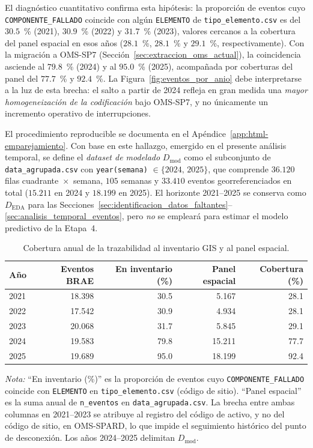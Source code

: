     El diagnóstico cuantitativo confirma esta hipótesis: la proporción de eventos cuyo \texttt{COMPONENTE\_FALLADO} coincide con algún \texttt{ELEMENTO} de \texttt{tipo\_elemento.csv} es del $30{.}5$~\% (2021), $30{.}9$~\% (2022) y $31{.}7$~\% (2023), valores cercanos a la cobertura del panel espacial en esos años ($28{.}1$~\%, $28{.}1$~\% y $29{.}1$~\%, respectivamente). Con la migración a OMS-SP7 (Sección~\ref{sec:extraccion_oms_actual}), la coincidencia asciende al $79{.}8$~\% (2024) y al $95{.}0$~\% (2025), acompañada por coberturas del panel del $77{.}7$~\% y $92{.}4$~\%. La Figura~\ref{fig:eventos_por_anio} debe interpretarse a la luz de esta brecha: el salto a partir de 2024 refleja en gran medida una \textit{mayor homogeneización de la codificación} bajo OMS-SP7, y no únicamente un incremento operativo de interrupciones.
    
    El procedimiento reproducible se documenta en el Apéndice~\ref{app:html-emparejamiento}. Con base en este hallazgo, emergido en el presente análisis temporal, se define el \textit{dataset de modelado} $D_{\mathrm{mod}}$ como el subconjunto de \texttt{data\_agrupada.csv} con \texttt{year(semana)} $\in \{2024,\,2025\}$, que comprende $36{.}120$ filas cuadrante~$\times$~semana, $105$ semanas y $33{.}410$ eventos georreferenciados en total ($15{.}211$ en 2024 y $18{.}199$ en 2025). El horizonte 2021--2025 se conserva como $D_{\mathrm{EDA}}$ para las Secciones~\ref{sec:identificacion_datos_faltantes}--\ref{sec:analisis_temporal_eventos}, pero \textit{no} se empleará para estimar el modelo predictivo de la Etapa~4.
    
    \begin{table}[!htbp]
    \centering
\footnotesize
    \setlength{\tabcolsep}{4pt}
    \caption{Cobertura anual de la trazabilidad al inventario GIS y al panel espacial.}
    \label{tab:cobertura_emparejamiento_oms}
    \begin{tabular}{@{}l r r r r@{}}
    \toprule
    \textbf{Año} & \textbf{Eventos BRAE} & \textbf{En inventario (\%)} & \textbf{Panel espacial} & \textbf{Cobertura (\%)} \\
    \midrule
    2021 & 18{.}398 & 30.5 & 5{.}167  & 28.1 \\
    2022 & 17{.}542 & 30.9 & 4{.}934  & 28.1 \\
    2023 & 20{.}068 & 31.7 & 5{.}845  & 29.1 \\
    2024 & 19{.}583 & 79.8 & 15{.}211 & 77.7 \\
    2025 & 19{.}689 & 95.0 & 18{.}199 & 92.4 \\
    \bottomrule
    \end{tabular}
    
    \noindent\textit{Nota:} ``En inventario (\%)'' es la proporción de eventos cuyo \texttt{COMPONENTE\_FALLADO} coincide con \texttt{ELEMENTO} en \texttt{tipo\_elemento.csv} (código de sitio). ``Panel espacial'' es la suma anual de \texttt{n\_eventos} en \texttt{data\_agrupada.csv}. La brecha entre ambas columnas en 2021--2023 se atribuye al registro del código de activo, y no del código de sitio, en OMS-SPARD, lo que impide el seguimiento histórico del punto de desconexión. Los años 2024--2025 delimitan $D_{\mathrm{mod}}$.
\end{table}

